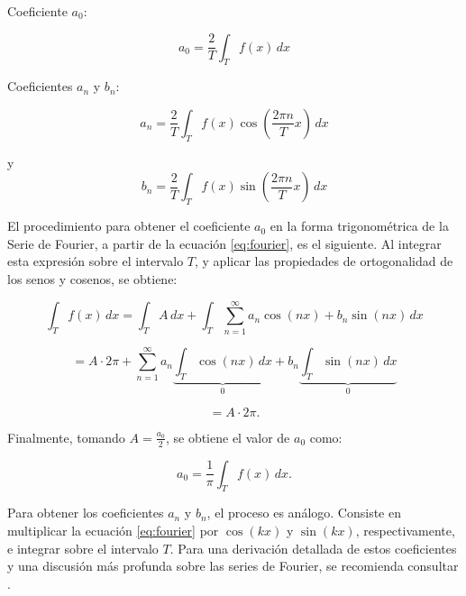{Coeficiente \( a_0 \):

\begin{equation}
\label{eq:a0Variable}
a_0 = \frac{2}{T} \int_T f(x) \, dx
\end{equation}
\vspace{10pt}

Coeficientes \( a_n \) y \( b_n \):
\vspace{10pt}

\begin{equation}
\label{eq:anVariable}
a_n = \frac{2}{T} \int_T f(x) \cos\left( \frac{2\pi n}{T} x \right) \, dx
\end{equation}

\vspace{10pt}
y
\vspace{10pt}
\begin{equation}
\label{eq:bnVariable}
b_n = \frac{2}{T} \int_T f(x) \sin\left( \frac{2\pi n}{T} x \right) \, dx
\end{equation}
\vspace{10pt}

El procedimiento para obtener el coeficiente \( a_0 \) en la forma trigonométrica de la Serie de Fourier, a partir de la ecuación \eqref{eq:fourier}, es el siguiente. Al integrar esta expresión sobre el intervalo \( T \), y aplicar las propiedades de ortogonalidad de los senos y cosenos, se obtiene:

\[
\int_T f(x) \, dx = \int_T A \, dx + \int_T \sum_{n=1}^{\infty} a_n \cos(nx) + b_n \sin(nx) \, dx 
\]

\begin{equation}
= A \cdot 2\pi + \sum_{n=1}^{\infty} a_n \underbrace{\int_T \cos(nx) \, dx}_{0} + b_n \underbrace{\int_T \sin(nx) \, dx}_{0}
\end{equation}

\[
= A \cdot 2\pi.
\]

Finalmente, tomando \( A = \frac{a_0}{2} \), se obtiene el valor de \( a_0 \) como:

\begin{equation}
a_0 = \frac{1}{\pi} \int_T f(x) \, dx.
\end{equation}
\vspace{10pt}

Para obtener los coeficientes \( a_n \) y \( b_n \), el proceso es análogo. Consiste en multiplicar la ecuación \eqref{eq:fourier} por \( \cos(kx) \) y \( \sin(kx) \), respectivamente, e integrar sobre el intervalo \( T \). Para una derivación detallada de estos coeficientes y una discusión más profunda sobre las series de Fourier, se recomienda consultar \cite{DiagoNanez2023}.

}
